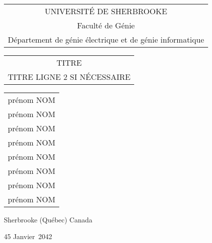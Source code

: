 
\thispagestyle{empty}
\vspace*{-0.5 in}
\begin{center}
  \begin{tabular}{c}
  \Large UNIVERSITÉ DE SHERBROOKE \\
  \Large Faculté de Génie \\
  \Large Département de génie électrique et de génie informatique \\
  \end{tabular}
\vfill
\vfill
  \begin{tabular}{c}
    \Large TITRE\\ \Large TITRE LIGNE 2 SI NÉCESSAIRE
  \end{tabular}
  \vfill
\begin{tabular}{c}
prénom NOM \\
prénom NOM \\
prénom NOM \\
prénom NOM \\
prénom NOM \\
prénom NOM \\
prénom NOM \\
prénom NOM \\
\end{tabular}
\vfill
{\Large Sherbrooke (Québec) Canada \par \vspace{2ex} 45 Janvier\ 2042}
\end{center}
\clearpage
\restoregeometry
\setcounter{page}{1}